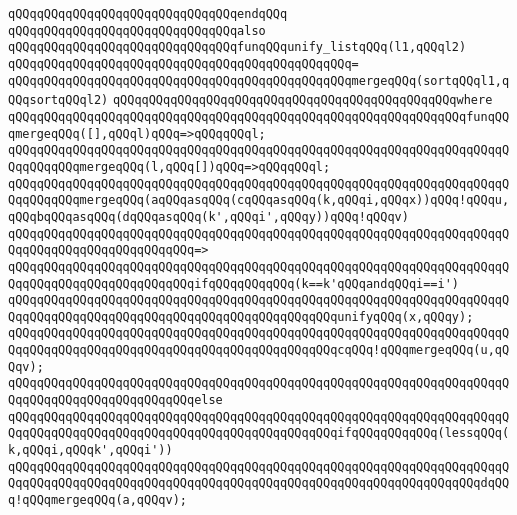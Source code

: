 \verb|qQQqqQQqqQQqqQQqqQQqqQQqqQQqqQQqendqQQq|\newline
\newline
\verb|qQQqqQQqqQQqqQQqqQQqqQQqqQQqqQQqalso|\newline
\verb|qQQqqQQqqQQqqQQqqQQqqQQqqQQqqQQqfunqQQqunify_listqQQq(l1,qQQql2)|\newline
\verb|qQQqqQQqqQQqqQQqqQQqqQQqqQQqqQQqqQQqqQQqqQQqqQQq=|\newline
\verb|qQQqqQQqqQQqqQQqqQQqqQQqqQQqqQQqqQQqqQQqqQQqqQQqmergeqQQq(sortqQQql1,qQQqsortqQQql2)|\newline
\verb|qQQqqQQqqQQqqQQqqQQqqQQqqQQqqQQqqQQqqQQqqQQqqQQqwhere|\newline
\verb|qQQqqQQqqQQqqQQqqQQqqQQqqQQqqQQqqQQqqQQqqQQqqQQqqQQqqQQqqQQqqQQqfunqQQqmergeqQQq([],qQQql)qQQq=>qQQqqQQql;|\newline
\verb|qQQqqQQqqQQqqQQqqQQqqQQqqQQqqQQqqQQqqQQqqQQqqQQqqQQqqQQqqQQqqQQqqQQqqQQqqQQqqQQqmergeqQQq(l,qQQq[])qQQq=>qQQqqQQql;|\newline
\newline
\verb|qQQqqQQqqQQqqQQqqQQqqQQqqQQqqQQqqQQqqQQqqQQqqQQqqQQqqQQqqQQqqQQqqQQqqQQqqQQqqQQqmergeqQQq(aqQQqasqQQq(cqQQqasqQQq(k,qQQqi,qQQqx))qQQq!qQQqu,qQQqbqQQqasqQQq(dqQQqasqQQq(k',qQQqi',qQQqy))qQQq!qQQqv)|\newline
\verb|qQQqqQQqqQQqqQQqqQQqqQQqqQQqqQQqqQQqqQQqqQQqqQQqqQQqqQQqqQQqqQQqqQQqqQQqqQQqqQQqqQQqqQQqqQQqqQQq=>|\newline
\verb|qQQqqQQqqQQqqQQqqQQqqQQqqQQqqQQqqQQqqQQqqQQqqQQqqQQqqQQqqQQqqQQqqQQqqQQqqQQqqQQqqQQqqQQqqQQqqQQqifqQQqqQQqqQQq(k==k'qQQqandqQQqi==i')|\newline
\newline
\verb|qQQqqQQqqQQqqQQqqQQqqQQqqQQqqQQqqQQqqQQqqQQqqQQqqQQqqQQqqQQqqQQqqQQqqQQqqQQqqQQqqQQqqQQqqQQqqQQqqQQqqQQqqQQqqQQqqQQqunifyqQQq(x,qQQqy);|\newline
\verb|qQQqqQQqqQQqqQQqqQQqqQQqqQQqqQQqqQQqqQQqqQQqqQQqqQQqqQQqqQQqqQQqqQQqqQQqqQQqqQQqqQQqqQQqqQQqqQQqqQQqqQQqqQQqqQQqqQQqcqQQq!qQQqmergeqQQq(u,qQQqv);|\newline
\verb|qQQqqQQqqQQqqQQqqQQqqQQqqQQqqQQqqQQqqQQqqQQqqQQqqQQqqQQqqQQqqQQqqQQqqQQqqQQqqQQqqQQqqQQqqQQqqQQqelse|\newline
\verb|qQQqqQQqqQQqqQQqqQQqqQQqqQQqqQQqqQQqqQQqqQQqqQQqqQQqqQQqqQQqqQQqqQQqqQQqqQQqqQQqqQQqqQQqqQQqqQQqqQQqqQQqqQQqqQQqqQQqifqQQqqQQqqQQq(lessqQQq(k,qQQqi,qQQqk',qQQqi'))|\newline
\newline
\verb|qQQqqQQqqQQqqQQqqQQqqQQqqQQqqQQqqQQqqQQqqQQqqQQqqQQqqQQqqQQqqQQqqQQqqQQqqQQqqQQqqQQqqQQqqQQqqQQqqQQqqQQqqQQqqQQqqQQqqQQqqQQqqQQqqQQqqQQqdqQQq!qQQqmergeqQQq(a,qQQqv);|\newline
